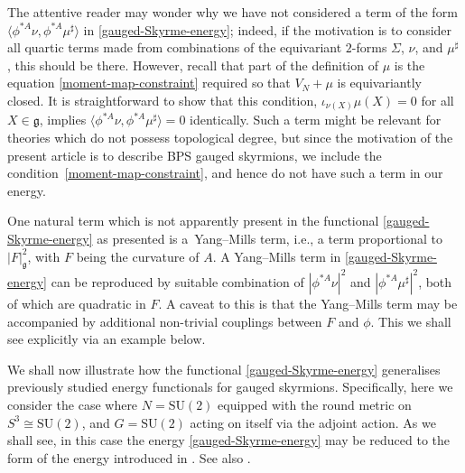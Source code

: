 \documentclass[10pt,a4paper]{amsart}
\newcommand{\g}{{\mathfrak{g}}}
\newcommand{\SU}{{\mathrm{SU}}}
\newcommand{\1}{{\mathbb{1}}}
\newcommand{\ip}[1]{\langle#1\rangle}
\numberwithin{equation}{section}
\begin{document}
The attentive reader may wonder why we have not considered a term of the form $\ip{\phi^{\ast A}\nu,\phi^{\ast A}\mu^\sharp}$ in \eqref{gauged-Skyrme-energy}; indeed, if the motivation is to consider all quartic terms made from combinations of the equivariant $2$-forms $\Sigma$, $\nu$, and $\mu^\sharp$, this should be there. However, recall that part of the definition of $\mu$ is the equation \eqref{moment-map-constraint} required so that $V_N+\mu$ is equivariantly closed. It is straightforward to show that this condition, $\iota_{\nu(X)}\mu(X)=0$ for all $X\in\g$, implies $\ip{\phi^{\ast A}\nu,\phi^{\ast A}\mu^\sharp}=0$ identically. Such a term might be relevant for theories which do not possess topological degree, but since the motivation of the present article is to describe BPS gauged skyrmions, we include the condition~\eqref{moment-map-constraint}, and hence do not have such a term in our energy.

One natural term which is not apparently present in the functional \eqref{gauged-Skyrme-energy} as presented is a~Yang--Mills term, i.e., a term proportional to $|F|_\g^2$, with $F$ being the curvature of $A$. A Yang--Mills term in \eqref{gauged-Skyrme-energy} can be reproduced by suitable combination of $|\phi^{\ast A}\nu|^2$ and $|\phi^{\ast A}\mu^\sharp|^2$, both of which are quadratic in $F$. A caveat to this is that the Yang--Mills term may be accompanied by additional non-trivial couplings between $F$ and $\phi$. This we shall see explicitly via an example below.

We shall now illustrate how the functional \eqref{gauged-Skyrme-energy} generalises previously studied energy functionals for gauged skyrmions. Specifically, here we consider the case where $N=\SU(2)$ equipped with the round metric on $S^3\cong\SU(2)$, and $G=\SU(2)$ acting on itself via the adjoint action. As we shall see, in this case the energy \eqref{gauged-Skyrme-energy} may be reduced to the form of the energy introduced in \cite{CorkHarlandWinyard2021gaugedskyrmelowbinding}. See also \cite[Section~8.2]{calliesfregierrogerszambon2016homotopy}.
\end{document}

